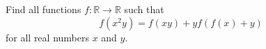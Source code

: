 Find all functions $f:\mathbb{R}\rightarrow\mathbb{R}$ such that $$f(x^2y)=f(xy)+yf(f(x)+y)$$for all real numbers $x$ and $y$.